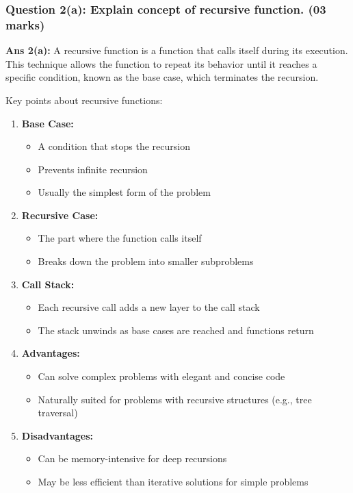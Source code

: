 \hypertarget{question-2a-explain-concept-of-recursive-function.-03-marks}{%
\subsubsection{Question 2(a): Explain concept of recursive function. (03
marks)}\label{question-2a-explain-concept-of-recursive-function.-03-marks}}

\textbf{Ans 2(a):} A recursive function is a function that calls itself
during its execution. This technique allows the function to repeat its
behavior until it reaches a specific condition, known as the base case,
which terminates the recursion.

Key points about recursive functions:

\begin{enumerate}
\def\labelenumi{\arabic{enumi}.}
\tightlist
\item
  \textbf{Base Case:}

  \begin{itemize}
  \tightlist
  \item
    A condition that stops the recursion
  \item
    Prevents infinite recursion
  \item
    Usually the simplest form of the problem
  \end{itemize}
\item
  \textbf{Recursive Case:}

  \begin{itemize}
  \tightlist
  \item
    The part where the function calls itself
  \item
    Breaks down the problem into smaller subproblems
  \end{itemize}
\item
  \textbf{Call Stack:}

  \begin{itemize}
  \tightlist
  \item
    Each recursive call adds a new layer to the call stack
  \item
    The stack unwinds as base cases are reached and functions return
  \end{itemize}
\item
  \textbf{Advantages:}

  \begin{itemize}
  \tightlist
  \item
    Can solve complex problems with elegant and concise code
  \item
    Naturally suited for problems with recursive structures (e.g., tree
    traversal)
  \end{itemize}
\item
  \textbf{Disadvantages:}

  \begin{itemize}
  \tightlist
  \item
    Can be memory-intensive for deep recursions
  \item
    May be less efficient than iterative solutions for simple problems
  \end{itemize}
\end{enumerate}

